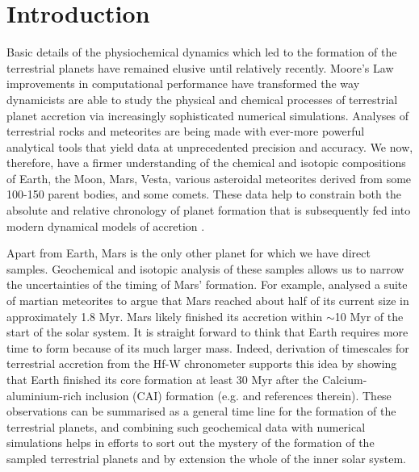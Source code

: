 \documentclass{aa}
\begin{document}

\maketitle

\section{Introduction}
\label{sec:intro}

Basic details of the physiochemical dynamics which led to the formation of the terrestrial planets have remained elusive until relatively recently. Moore’s Law improvements in computational performance have transformed the way dynamicists are able to study the physical and chemical processes of terrestrial planet accretion via increasingly sophisticated numerical simulations. Analyses of terrestrial rocks and meteorites are being made with ever-more powerful analytical tools that yield data at unprecedented precision and accuracy. We now, therefore, have a firmer understanding of the chemical and isotopic compositions of Earth, the Moon, Mars, Vesta, various asteroidal meteorites derived from some 100-150 parent bodies, and some comets. These data help to constrain both the absolute and relative chronology of planet formation that is subsequently fed into modern dynamical models of accretion  \citep[e.g.][]{morbidelli2012building}.

Apart from Earth, Mars is the only other planet for which we have direct samples. Geochemical and isotopic analysis of these samples allows us to narrow the uncertainties of the timing of Mars’ formation. For example, \cite{dauphas2011hf} analysed a suite of martian meteorites to argue that Mars reached about half of its current size in approximately 1.8 Myr. Mars likely finished its accretion within $\sim$10 Myr of the start of the solar system. It is straight forward to think that Earth requires more time to form because of its much larger mass. Indeed, derivation of timescales for terrestrial accretion from the Hf-W chronometer supports this idea by showing that Earth finished its core formation at least 30 Myr after the Calcium-aluminium-rich inclusion (CAI) formation (e.g. \cite{kleine2009hf} and references therein). These observations can be summarised as a general time line for the formation of the terrestrial planets, and combining such geochemical data with numerical simulations helps in efforts to sort out the mystery of the formation of the sampled terrestrial planets and by extension the whole of the inner solar system.
\end{document}
